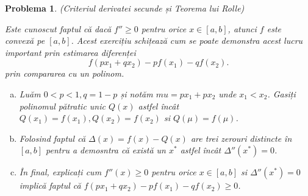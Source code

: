\documentclass[a4paper,12pt,oneside]{report}
\newtheorem{problem}{Problema}
\begin{document}
\begin{problem} (Criteriul derivatei secunde și Teorema lui Rolle)
	
Este cunoscut faptul că dacă \({f}'' \geq 0\) pentru orice \(x\in \left [ a,b \right ]\), atunci \(f\) este convexă pe \(\left [ a,b \right ]\). Acest exercițiu schițează cum se poate demonstra acest lucru important prin estimarea diferenței
\begin{displaymath}
  f\left ( px_{1} + qx_{2}\right ) - pf\left ( x_{1} \right ) - qf\left ( x_{2} \right ).
\end{displaymath}
 prin compararea cu un polinom.
 \begin{enumerate}[a)]
\item Luăm \(0< p < 1, q = 1-p\) și notăm \(mu = px_{1} + px_{2}\) unde \(x_{1} < x_{2}\).  Gasiți polinomul pătratic unic \(Q\left ( x \right )\) astfel încât  \(Q\left ( x_{1} \right ) = f\left ( x_{1} \right ), Q\left ( x_{2} \right ) = f\left ( x_{2} \right )\) si \(Q\left ( \mu  \right ) = f\left ( \mu  \right )\).
\item Folosind faptul că \(\Delta \left ( x \right ) =  f\left ( x \right ) - Q\left ( x \right )\) are trei zerouri distincte în \(\left [ a,b \right ]\) pentru a demosntra că există un \(x^{*}\) astfel încât \({\Delta }''\left ( x^{*} \right ) = 0\).
\item În final, explicați cum \({f}''\left ( x \right ) \geq 0\) pentru orice \(x\in \left [ a,b \right ]\) si \({\Delta }''\left ( x^{*} \right ) = 0\) implică faptul că \(f\left ( px_{1} + qx_{2} \right ) - pf\left ( x_{1} \right ) - qf\left ( x_{2} \right ) \geq 0\).
\end{enumerate}
\end{problem}
\end{document}
